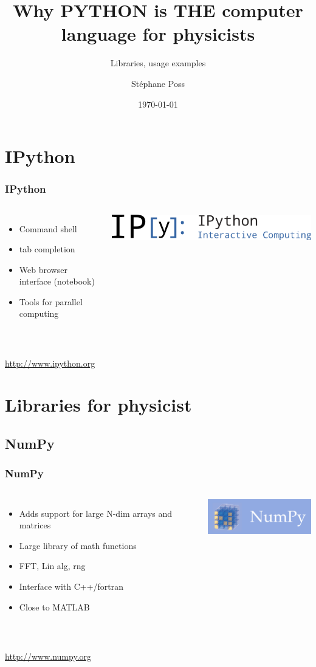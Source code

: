 \documentclass[14pt]{beamer}
\title{Why PYTHON is THE computer language for physicists}
\subtitle{Libraries, usage examples}
\author{St\'ephane Poss}
\date{\today}
\begin{document}
\begin{frame}[plain]
\titlepage
\end{frame}

\begin{frame}
\tableofcontents
\end{frame}

\section{IPython}
\begin{frame}
\frametitle{IPython}
\begin{columns}
\begin{itemize}
\item Command shell 
\item tab completion
\item Web browser interface (notebook)
\item Tools for parallel computing
\end{itemize}
\includegraphics[width=\textwidth]{IPython_Logo.png}
\end{columns}
~\\
\url{http://www.ipython.org}
\end{frame}

\section{Libraries for physicist}

\subsection{NumPy}
\begin{frame}
\frametitle{NumPy}
\begin{columns}
\begin{itemize}
\item Adds support for large N-dim arrays and matrices
\item Large library of math functions
\item FFT, Lin alg, rng
\item Interface with C++/fortran
\item Close to MATLAB
\end{itemize}
\includegraphics[width=\textwidth]{NumPy_logo.png}
\end{columns}
~\\
\url{http://www.numpy.org}
\end{frame}
\end{document}

